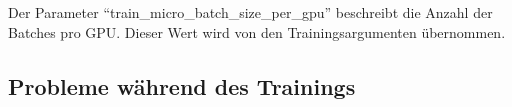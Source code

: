 Der Parameter \enquote{train\_micro\_batch\_size\_per\_gpu} beschreibt die Anzahl der Batches pro GPU.
Dieser Wert wird von den Trainingsargumenten übernommen.\\

\subsection{Probleme während des Trainings}\label{sec:problem-training}




%
